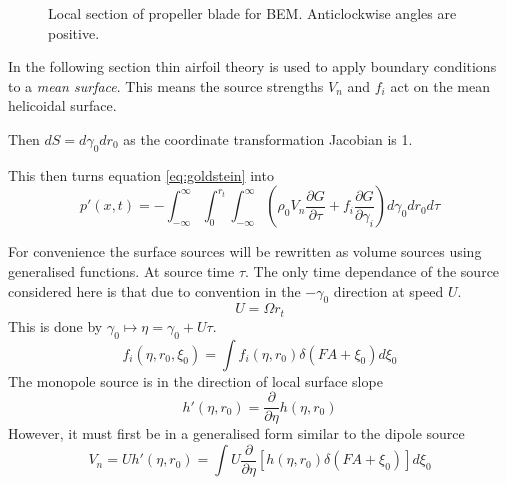\documentclass[8pt]{article}
\begin{document}
\begin{figure}[H]
    \centering
    \caption{Local section of propeller blade for BEM. Anticlockwise angles are positive.}
    \label{fig:single_blade}
\end{figure}

In the following section thin airfoil theory is used to apply boundary conditions to a \textit{mean surface}.
This means the source strengths $V_n$ and $f_i$ act on the mean helicoidal surface.

Then $ dS = d\gamma_0 dr_0 $ as the coordinate transformation Jacobian is 1.

This then turns equation \ref{eq:goldstein} into
\begin{equation}
p'(x, t) = -\int_{-\infty}^\infty \int_0^{r_t} \int_{-\infty}^\infty \left( \rho_0 V_n \frac{\partial G}{\partial \tau} + f_i \frac{\partial G}{\partial \gamma_i} \right)d\gamma_0 dr_0 d\tau
\end{equation}

For convenience the surface sources will be rewritten as volume sources using generalised functions.
At source time $\tau$.
The only time dependance of the source considered here is that due to convention in the $-\gamma_0$ direction at speed $U$.
\begin{equation}
    U = \Omega r_t
\end{equation}
This is done by $ \gamma_0 \mapsto \eta = \gamma_0 + U\tau$.
\begin{equation}
    f_i(\eta,r_0,\xi_0) = \int f_i(\eta, r_0)\delta(FA + \xi_0) d\xi_0
\end{equation}
The monopole source is in the direction of local surface slope
\begin{equation}
    h'(\eta,r_0) = \frac{\partial }{\partial \eta} h(\eta,r_0)
\end{equation}
However, it must first be in a generalised form similar to the dipole source
\begin{equation}
    V_n = Uh'(\eta,r_0) = \int U\frac{\partial }{\partial \eta} \left[ h(\eta,r_0)\delta(FA + \xi_0) \right] d\xi_0 
\end{equation}
\end{document}
